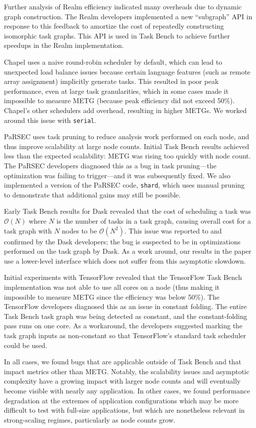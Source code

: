 {\color{blue}
Further analysis of Realm efficiency indicated many overheads due to
dynamic graph construction. The Realm developers implemented a new
``subgraph'' API in response to this feedback to amortize the cost of
repeatedly constructing isomorphic task graphs. This API is used in
Task Bench to achieve further speedups in the Realm implementation.

Chapel uses a naive round-robin scheduler by default, which can lead
to unexpected load balance issues because certain language features
(such as remote array assignment) implicitly generate tasks. This
resulted in poor peak performance, even at large task granularities,
which in some cases made it impossible to measure METG (because peak
efficiency did not exceed 50\%). Chapel's other schedulers add
overhead, resulting in higher METGs. We worked around this issue with
\lstinline{serial}.

PaRSEC uses task pruning to reduce analysis work performed on each
node, and thus improve scalability at large node
counts. Initial Task Bench results achieved less than the expected
scalability: METG was rising too quickly with node count.  The PaRSEC
developers diagnosed this as a bug in task pruning---the optimization was failing to trigger---and it was
subsequently fixed. We also implemented a version of the PaRSEC code,
\lstinline{shard}, which uses manual pruning to demonstrate that
additional gains may still be possible.

Early Task Bench results for Dask revealed that the cost of scheduling
a task was $\mathcal{O}(N)$ where $N$ is the number of tasks in a task
graph, causing overall cost for a task graph with $N$ nodes to be
$\mathcal{O}(N^2)$. This issue was reported to and confirmed by the
Dask developers; the bug is suspected to be in optimizations performed
on the task graph by Dask. As a work around, our results in the paper use a
lower-level interface which does not suffer from this asymptotic
slowdown.

Initial experiments with TensorFlow revealed that the TensorFlow Task
Bench implementation was not able to use all cores on a node (thus
making it impossible to measure METG since the efficiency was below
50\%). The TensorFlow developers diagnosed this as an issue in
constant folding. The entire Task Bench task graph was being detected
as constant, and the constant-folding pass runs on one core. As a
workaround, the developers suggested marking the task graph inputs as
non-constant so that TensorFlow's standard task scheduler could be
used.

In all cases, we found bugs that are applicable outside of Task Bench
and that impact metrics other than METG. Notably, the scalability
issues and asymptotic complexity have a growing impact with larger
node counts and will eventually become visible with nearly any
application. In other cases, we found performance degradation at the
extremes of application configurations which may be more difficult to
test with full-size applications, but which are nonetheless relevant
in strong-scaling regimes, particularly as node counts grow.

} %

